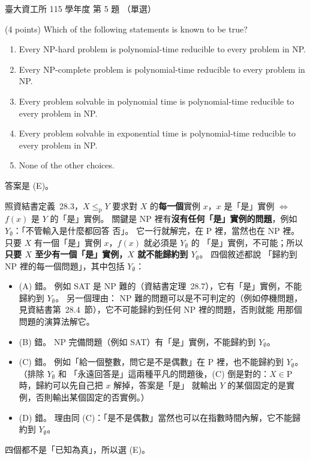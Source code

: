 \begin{pastexam}[label={px:ntu-115-dsa-05}]{臺大資工所 115 學年度 第 5 題}
（單選）

(4 points) Which of the following statements is known to be true?
\begin{enumerate}[label=(\Alph*)]
\item Every NP-hard problem is polynomial-time reducible to every problem in NP.
\item Every NP-complete problem is polynomial-time reducible to every problem in NP.
\item Every problem solvable in polynomial time is polynomial-time reducible to every problem in NP.
\item Every problem solvable in exponential time is polynomial-time reducible to every problem in NP.
\item None of the other choices.
\end{enumerate}
\end{pastexam}

\begin{pastsoln}
答案是 (E)。

照資結書定義~28.3，$X \le_{\mathrm{p}} Y$ 要求對 $X$ 的\textbf{每一個}實例 $x$，$x$ 是「是」實例 $\iff$ $f(x)$ 是
$Y$ 的「是」實例。 關鍵是 NP 裡有\textbf{沒有任何「是」實例的問題}，例如 $Y_\emptyset$：「不管輸入是什麼都回答
否」。 它一行就解完，在 P 裡，當然也在 NP 裡。 只要 $X$ 有一個「是」實例 $x$，$f(x)$ 就必須是 $Y_\emptyset$ 的
「是」實例，不可能；所以\textbf{只要 $X$ 至少有一個「是」實例，$X$ 就不能歸約到 $Y_\emptyset$}。 四個敘述都說
「歸約到 NP 裡的每一個問題」，其中包括 $Y_\emptyset$：
\begin{itemize}
\item (A) 錯。 例如 SAT 是 NP 難的（資結書定理~28.7），它有「是」實例，不能歸約到 $Y_\emptyset$。 另一個理由：
NP 難的問題可以是不可判定的（例如停機問題，見資結書第~28.4~節），它不可能歸約到任何 NP 裡的問題，否則就能
用那個問題的演算法解它。
\item (B) 錯。 NP 完備問題（例如 SAT）有「是」實例，不能歸約到 $Y_\emptyset$。
\item (C) 錯。 例如「給一個整數，問它是不是偶數」在 P 裡，也不能歸約到 $Y_\emptyset$。 （排除 $Y_\emptyset$ 和
「永遠回答是」這兩種平凡的問題後，(C) 倒是對的：$X \in \mathrm{P}$ 時，歸約可以先自己把 $x$ 解掉，答案是「是」
就輸出 $Y$ 的某個固定的是實例，否則輸出某個固定的否實例。）
\item (D) 錯。 理由同 (C)：「是不是偶數」當然也可以在指數時間內解，它不能歸約到 $Y_\emptyset$。
\end{itemize}
四個都不是「已知為真」，所以選 (E)。
\end{pastsoln}
